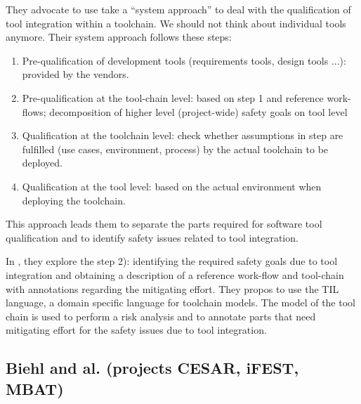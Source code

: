 They advocate to use take a ``system approach''  to deal with the qualification of tool integration within a toolchain. We should not
think about individual tools anymore.  Their system approach follows these steps:

\begin{enumerate}
\item Pre-qualification of development tools (requirements tools, design
  tools ...): provided by the vendors.
\item Pre-qualification at the tool-chain level: based on step 1 and
  reference work-flows; decomposition of higher level (project-wide) safety goals on tool level
\item Qualification at the toolchain level: check whether assumptions in step are fulfilled (use cases, environment, process) by the actual toolchain to be deployed.
\item Qualification at the tool level: based on the actual environment
  when deploying the toolchain.
\end{enumerate}
This approach leads them to separate the parts required for software tool
qualification and to identify safety issues related to tool integration.

In \cite{asplund_towards_2012}, they explore the step 2): identifying
the required safety goals due to tool integration and obtaining a
description of a reference work-flow and tool-chain with annotations regarding the mitigating effort.  They propos to use the TIL language, a
domain specific language for toolchain models.  The model of the tool
chain is used to perform a risk analysis and to annotate parts
that need mitigating effort for the safety issues due to tool
integration. 

\subsection{Biehl and al. (projects CESAR, iFEST, MBAT)}
\label{sec-1-2.3}

